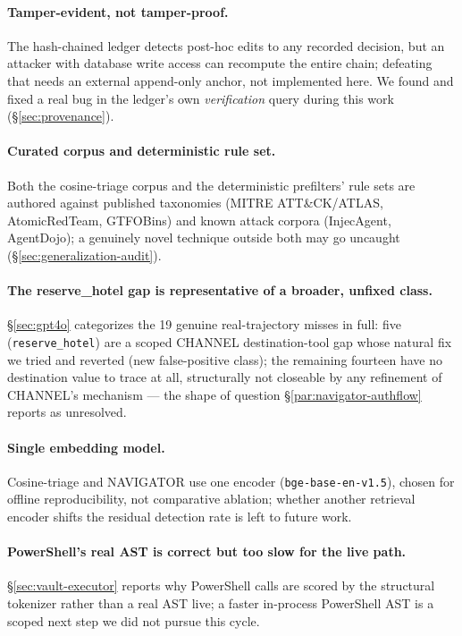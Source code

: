 \paragraph{Tamper-evident, not tamper-proof.} The hash-chained ledger
detects post-hoc edits to any recorded decision, but an attacker with
database write access can recompute the entire chain; defeating that
needs an external append-only anchor, not implemented here. We found and
fixed a real bug in the ledger's own \emph{verification} query during
this work (\S\ref{sec:provenance}).

\paragraph{Curated corpus and deterministic rule set.} Both the
cosine-triage corpus and the deterministic prefilters' rule sets are
authored against published taxonomies (MITRE ATT\&CK/ATLAS, AtomicRedTeam,
GTFOBins) and known attack corpora (InjecAgent, AgentDojo); a genuinely
novel technique outside both may go uncaught (\S\ref{sec:generalization-audit}).

\paragraph{The reserve\_hotel gap is representative of a broader,
unfixed class.} \S\ref{sec:gpt4o} categorizes the 19 genuine
real-trajectory misses in full: five (\texttt{reserve\_hotel}) are a
scoped CHANNEL destination-tool gap whose natural fix we tried and
reverted (new false-positive class); the remaining fourteen have no
destination value to trace at all, structurally not closeable by any
refinement of CHANNEL's mechanism --- the shape of question
\S\ref{par:navigator-authflow} reports as unresolved.

\paragraph{Single embedding model.} Cosine-triage and NAVIGATOR use one
encoder (\texttt{bge-base-en-v1.5}), chosen for offline reproducibility,
not comparative ablation; whether another retrieval encoder shifts the
residual detection rate is left to future work.

\paragraph{PowerShell's real AST is correct but too slow for the live
path.} \S\ref{sec:vault-executor} reports why PowerShell calls are scored
by the structural tokenizer rather than a real AST live; a faster
in-process PowerShell AST is a scoped next step we did not pursue this
cycle.

